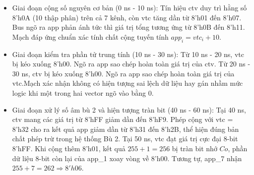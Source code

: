 \documentclass[12pt,a4paper,oneside]{book}
\begin{document}
\begin{itemize}
    \item Giai đoạn cộng số nguyên cơ bản (0 ns - 10 ns): Tín hiệu ctv duy trì hằng số 8'h0A (10 thập phân) trên cả 7 kênh, còn vtc tăng dần từ 8'h01 đến 8'h07. Bus ngõ ra app phản ánh tức thì giá trị tổng tương ứng từ 8'h0B đến 8'h11. Mạch đáp ứng chuẩn xác tính chất cộng tuyến tính $app_i = vtc_i + 10$.
    \item Giai đoạn kiểm tra phần tử trung tính (10 ns - 30 ns): Từ 10 ns - 20 ns, vtc bị kéo xuống 8'h00. Ngõ ra app sao chép hoàn toàn giá trị của ctv. Từ 20 ns - 30 ns, ctv bị kéo xuống 8'h00. Ngõ ra app sao chép hoàn toàn giá trị của vtc.Mạch xác nhận không có hiện tượng sai lệch dữ liệu hay gán nhầm mức logic khi một trong hai vector ngõ vào bằng $0$.
    \item Giai đoạn xử lý số âm bù 2 và hiện tượng tràn bit (40 ns - 60 ns): Tại 40 ns, ctv mang các giá trị từ 8'hFF giảm dần đến 8'hF9. Phép cộng với vtc = 8'h32 cho ra kết quả app giảm dần từ 8'h31 đến 8'h2B, thể hiện đúng bản chất phép trừ trong hệ thống Bù 2. Tại 50 ns, vtc đạt giá trị cực đại 8-bit 8'hFF. Khi cộng thêm 8'h01, kết quả $255 + 1 = 256$ bị tràn bit nhớ $Co$, phần dữ liệu 8-bit còn lại của app\_1 xoay vòng về 8'h00. Tương tự, app\_7 nhận $255 + 7 = 262 \Rightarrow 8'h06$.
\end{itemize}

\begin{table}[H]
\centering
{}
\caption{Tổng hợp thông số Diện tích và Công suất của khối Min/Submin Calculationn qua các process corners.}
\end{table}
\end{document}
